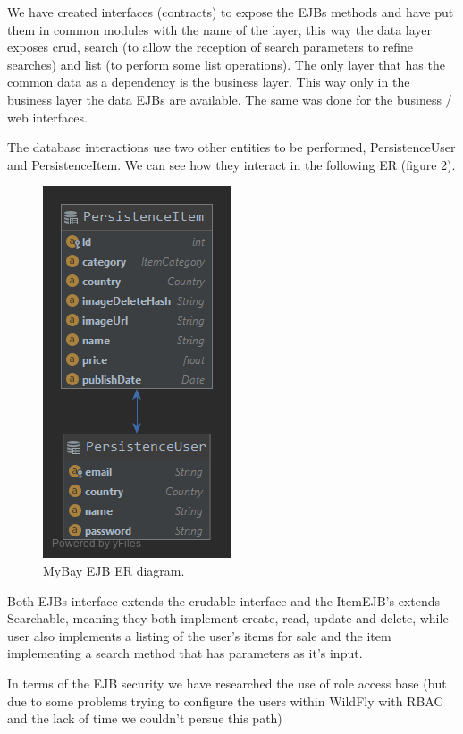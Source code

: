\documentclass{article}
\begin{document}
\qquad We have created interfaces (contracts) to expose the \ac{EJB}s methods and have put them in common modules with the name of the layer, this way the data layer exposes crud, search (to allow the reception of search parameters to refine searches) and list (to perform some list operations). The only layer that has the common data as a dependency is the business layer. This way only in the business layer the data \ac{EJB}s are available. The same was done for the business / web interfaces.

\qquad The database interactions use two other entities to be performed, PersistenceUser and PersistenceItem.  We can see how they interact in the following \ac{ER} (figure 2).

\begin{figure}[H]
 \centering
 \includegraphics[scale=0.4]{ER_MyBay.png}
 \caption{MyBay \ac{EJB} \ac{ER} diagram.}
 \label{fig:er}
\end{figure}

\qquad Both \ac{EJB}s interface extends the crudable interface and the ItemEJB's extends Searchable, meaning they both implement create, read, update and delete, while user also implements a listing of the user's items for sale and the item implementing a search method that has parameters as it's input.

\qquad In terms of the \ac{EJB} security we have researched the use of role access base (but due to some problems trying to configure the users within WildFly with RBAC and the lack of time we couldn't persue this path)
\end{document}
